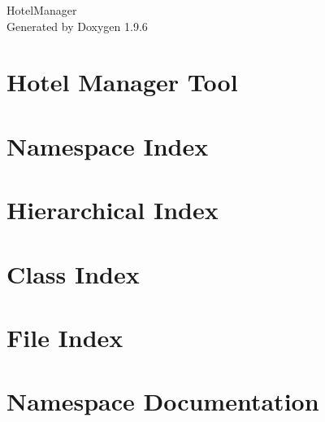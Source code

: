 \documentclass[twoside]{book}
\newcommand{\+}{\discretionary{\mbox{\scriptsize$\hookleftarrow$}}{}{}}
\newcommand{\clearemptydoublepage}{%
    \newpage{\pagestyle{empty}\cleardoublepage}%
  }
\begin{document}
  \raggedbottom
    \hypersetup{pageanchor=false,
                bookmarksnumbered=true,
                pdfencoding=unicode
               }
  \begin{titlepage}
  \vspace*{7cm}
  \begin{center}%
  {\Large Hotel\+Manager}\\
  \vspace*{1cm}
  {\large Generated by Doxygen 1.9.6}\\
  \end{center}
  \end{titlepage}
  \clearemptydoublepage
  \tableofcontents
  \clearemptydoublepage
  \hypersetup{pageanchor=true}
\chapter{Hotel Manager Tool}
\label{md__c___users_andon__documents__git_hub__b_s_p_q23__e5_2__r_e_a_d_m_e}

\chapter{Namespace Index}

\chapter{Hierarchical Index}

\chapter{Class Index}

\chapter{File Index}

\chapter{Namespace Documentation}










\end{document}
